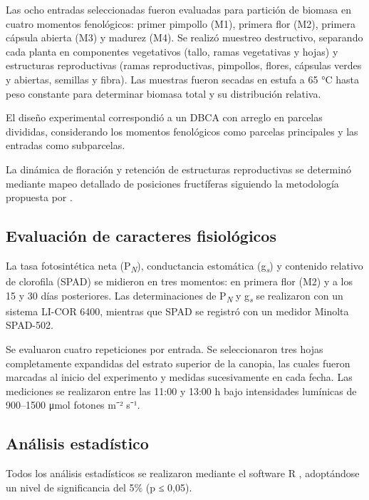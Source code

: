 \documentclass[12pt,oneside]{reedthesis}
\begin{document}
Las ocho entradas seleccionadas fueron evaluadas para partición de biomasa en cuatro momentos fenológicos: primer pimpollo (M1), primera flor (M2), primera cápsula abierta (M3) y madurez (M4). Se realizó muestreo destructivo, separando cada planta en componentes vegetativos (tallo, ramas vegetativas y hojas) y estructuras reproductivas (ramas reproductivas, pimpollos, flores, cápsulas verdes y abiertas, semillas y fibra). Las muestras fueron secadas en estufa a 65 °C hasta peso constante para determinar biomasa total y su distribución relativa.

El diseño experimental correspondió a un DBCA con arreglo en parcelas divididas, considerando los momentos fenológicos como parcelas principales y las entradas como subparcelas.

La dinámica de floración y retención de estructuras reproductivas se determinó mediante mapeo detallado de posiciones fructíferas siguiendo la metodología propuesta por \textcite{kerby2010} .

\subsection{Evaluación de caracteres fisiológicos}\label{evaluaciuxf3n-de-caracteres-fisioluxf3gicos}

La tasa fotosintética neta (P\textsubscript{\emph{N}}), conductancia estomática (g\textsubscript{\emph{s}}) y contenido relativo de clorofila (SPAD) se midieron en tres momentos: en primera flor (M2) y a los 15 y 30 días posteriores. Las determinaciones de P\textsubscript{\emph{N}} y g\textsubscript{\emph{s}} se realizaron con un sistema LI-COR 6400, mientras que SPAD se registró con un medidor Minolta SPAD-502.

Se evaluaron cuatro repeticiones por entrada. Se seleccionaron tres hojas completamente expandidas del estrato superior de la canopia, las cuales fueron marcadas al inicio del experimento y medidas sucesivamente en cada fecha. Las mediciones se realizaron entre las 11:00 y 13:00 h bajo intensidades lumínicas de 900--1500 μmol fotones m⁻² s⁻¹.

\subsection{Análisis estadístico}\label{anuxe1lisis-estaduxedstico}

Todos los análisis estadísticos se realizaron mediante el software R \autocite{R2024}, adoptándose un nivel de significancia del 5\% (p ≤ 0,05).
\end{document}
